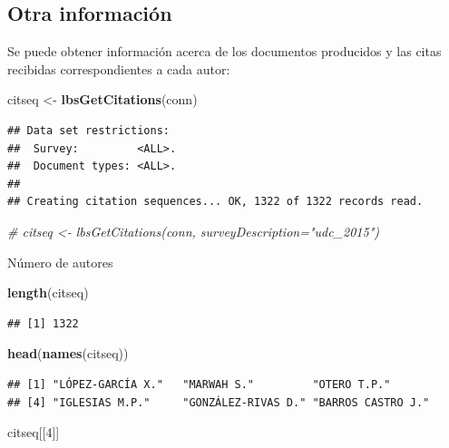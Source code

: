 \documentclass[]{book}
\newenvironment{Shaded}{\begin{snugshade}}{\end{snugshade}}
\newcommand{\KeywordTok}[1]{\textcolor[rgb]{0.13,0.29,0.53}{\textbf{#1}}}
\newcommand{\DecValTok}[1]{\textcolor[rgb]{0.00,0.00,0.81}{#1}}
\newcommand{\StringTok}[1]{\textcolor[rgb]{0.31,0.60,0.02}{#1}}
\newcommand{\CommentTok}[1]{\textcolor[rgb]{0.56,0.35,0.01}{\textit{#1}}}
\newcommand{\NormalTok}[1]{#1}
\begin{document}
\subsection{Otra información}\label{otra-informaciuxf3n}

Se puede obtener información acerca de los documentos producidos y las
citas recibidas correspondientes a cada autor:

\begin{Shaded}
\begin{Highlighting}[]
\NormalTok{citseq <-}\StringTok{ }\KeywordTok{lbsGetCitations}\NormalTok{(conn)}
\end{Highlighting}
\end{Shaded}

\begin{verbatim}
## Data set restrictions:
##  Survey:         <ALL>.
##  Document types: <ALL>.
## 
## Creating citation sequences... OK, 1322 of 1322 records read.
\end{verbatim}

\begin{Shaded}
\begin{Highlighting}[]
\CommentTok{# citseq <- lbsGetCitations(conn, surveyDescription="udc_2015")}
\end{Highlighting}
\end{Shaded}

Número de autores

\begin{Shaded}
\begin{Highlighting}[]
\KeywordTok{length}\NormalTok{(citseq) }
\end{Highlighting}
\end{Shaded}

\begin{verbatim}
## [1] 1322
\end{verbatim}

\begin{Shaded}
\begin{Highlighting}[]
\KeywordTok{head}\NormalTok{(}\KeywordTok{names}\NormalTok{(citseq))}
\end{Highlighting}
\end{Shaded}

\begin{verbatim}
## [1] "LÓPEZ-GARCÍA X."   "MARWAH S."         "OTERO T.P."       
## [4] "IGLESIAS M.P."     "GONZÁLEZ-RIVAS D." "BARROS CASTRO J."
\end{verbatim}

\begin{Shaded}
\begin{Highlighting}[]
\NormalTok{citseq[[}\DecValTok{4}\NormalTok{]]}
\end{Highlighting}
\end{Shaded}
\end{document}
